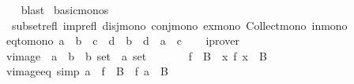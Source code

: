 \begin{isabellebody}
%
\isadelimproof
\ \ %
\endisadelimproof
%
\isatagproof
{}\isamarkupfalse%
\ blast%
\endisatagproof
{\isafoldproof}%
%
\isadelimproof
\isanewline
%
\endisadelimproof
\isanewline
{}\isamarkupfalse%
\ basic{\isacharunderscore}{\kern0pt}monos\ {\isacharequal}{\kern0pt}\isanewline
\ \ subset{\isacharunderscore}{\kern0pt}refl\ imp{\isacharunderscore}{\kern0pt}refl\ disj{\isacharunderscore}{\kern0pt}mono\ conj{\isacharunderscore}{\kern0pt}mono\ ex{\isacharunderscore}{\kern0pt}mono\ Collect{\isacharunderscore}{\kern0pt}mono\ in{\isacharunderscore}{\kern0pt}mono\isanewline
\isanewline
{}\isamarkupfalse%
\ eq{\isacharunderscore}{\kern0pt}to{\isacharunderscore}{\kern0pt}mono{\isacharcolon}{\kern0pt}\ {\isachardoublequoteopen}a\ {\isacharequal}{\kern0pt}\ b\ {\isasymLongrightarrow}\ c\ {\isacharequal}{\kern0pt}\ d\ {\isasymLongrightarrow}\ b\ {\isasymlongrightarrow}\ d\ {\isasymLongrightarrow}\ a\ {\isasymlongrightarrow}\ c{\isachardoublequoteclose}\isanewline
%
\isadelimproof
\ \ %
\endisadelimproof
%
\isatagproof
{}\isamarkupfalse%
\ iprover%
\endisatagproof
{\isafoldproof}%
%
\isadelimproof
%
\endisadelimproof
%
\isadelimdocument
%
\endisadelimdocument
%
\isatagdocument
%
\isamarkuptrue%
%
\endisatagdocument
{\isafolddocument}%
%
\isadelimdocument
%
\endisadelimdocument
{}\isamarkupfalse%
\ vimage\ {\isacharcolon}{\kern0pt}{\isacharcolon}{\kern0pt}\ {\isachardoublequoteopen}{\isacharparenleft}{\kern0pt}{\isacharprime}{\kern0pt}a\ {\isasymRightarrow}\ {\isacharprime}{\kern0pt}b{\isacharparenright}{\kern0pt}\ {\isasymRightarrow}\ {\isacharprime}{\kern0pt}b\ set\ {\isasymRightarrow}\ {\isacharprime}{\kern0pt}a\ set{\isachardoublequoteclose}\ \ {\isacharparenleft}{\kern0pt}\ {\isachardoublequoteopen}{\isacharminus}{\kern0pt}{\isacharbackquote}{\kern0pt}{\isachardoublequoteclose}\ {}{}{\isacharparenright}{\kern0pt}\isanewline
\ \ \ {\isachardoublequoteopen}f\ {\isacharminus}{\kern0pt}{\isacharbackquote}{\kern0pt}\ B\ {\isasymequiv}\ {\isacharbraceleft}{\kern0pt}x{\isachardot}{\kern0pt}\ f\ x\ {\isasymin}\ B{\isacharbraceright}{\kern0pt}{\isachardoublequoteclose}\isanewline
\isanewline
{}\isamarkupfalse%
\ vimage{\isacharunderscore}{\kern0pt}eq\ {\isacharbrackleft}{\kern0pt}simp{\isacharbrackright}{\kern0pt}{\isacharcolon}{\kern0pt}\ {\isachardoublequoteopen}a\ {\isasymin}\ f\ {\isacharminus}{\kern0pt}{\isacharbackquote}{\kern0pt}\ B\ {\isasymlongleftrightarrow}\ f\ a\ {\isasymin}\ B{\isachardoublequoteclose}\isanewline

\end{isabellebody}
